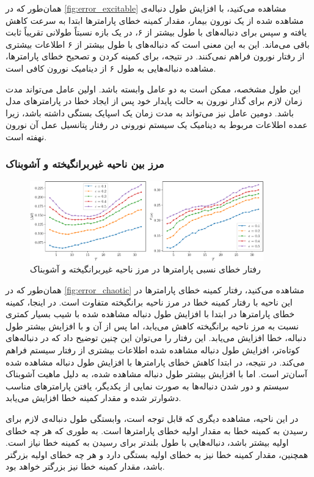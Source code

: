 همان‌طور که در
\autoref{fig:error_excitable}
مشاهده می‌کنید، با افزایش طول دنباله‌ی مشاهده شده از یک نورون بیمار، مقدار کمینه خطای پارامترها ابتدا به سرعت کاهش یافته و سپس
برای دنباله‌های با طول بیشتر از ۶، در یک بازه نسبتاً طولانی تقریباً ثابت باقی می‌ماند.
این به این معنی است که دنباله‌های با طول بیشتر از ۶ اطلاعات بیشتری از رفتار نورون فراهم نمی‌کنند.
در نتیجه، برای کمینه کردن و تصحیح خطای پارامترها، مشاهده دنباله‌هایی به طول ۶ از دینامیک نورون کافی است.

این طول مشخصه، ممکن است به دو عامل وابسته باشد.
اولین عامل می‌تواند مدت زمان لازم برای گذار نورون به حالت پایدار خود پس از ایجاد خطا در پارامتر‌های مدل باشد.
دومین عامل نیز می‌تواند به مدت زمان یک اسپایک بستگی داشته باشد، زیرا عمده اطلاعات مربوط به دینامیک یک سیستم نورونی در رفتار پتانسیل عمل آن نورون نهفته است.

\subsubsection{مرز بین ناحیه غیربرانگیخته و آشوبناک}

\begin{figure}[!ht]
    \centering
    \includegraphics[width=0.9\textwidth]{figures/error_chaotic}
    \caption{رفتار خطای نسبی پارامترها در مرز ناحیه غیربرانگیخته و آشوبناک}
    \label{fig:error_chaotic}
\end{figure}

همان‌طور که در
\autoref{fig:error_chaotic}
مشاهده می‌کنید،
رفتار کمینه خطای پارامترها در این ناحیه با رفتار کمینه خطا در مرز ناحیه برانگیخته متفاوت است.
در اینجا، کمینه خطای پارامترها در ابتدا با افزایش طول دنباله مشاهده شده با شیب بسیار کمتری نسبت به مرز ناحیه برانگیخته کاهش می‌یابد، اما پس از آن و با افزایش بیشتر طول دنباله، خطا افزایش می‌یابد.
این رفتار را می‌توان این چنین توضیح داد که در دنباله‌های کوتاه‌تر، افزایش طول دنباله مشاهده شده اطلاعات بیشتری از رفتار سیستم فراهم می‌کند.
در نتیجه، در ابتدا کاهش خطای پارامترها با افزایش طول دنباله مشاهده شده آسان‌تر است.
اما با افزایش بیشتر طول دنباله مشاهده شده، به دلیل ماهیت آشوبناک سیستم و دور شدن دنباله‌ها به صورت نمایی از یکدیگر، یافتن پارامترهای مناسب دشوارتر شده و مقدار کمینه خطا افزایش می‌یابد.

در این ناحیه، مشاهده دیگری که قابل توجه است، وابستگی طول دنباله‌ی لازم برای رسیدن به کمینه خطا به مقدار اولیه خطای پارامترها است.
به طوری که هر چه خطای اولیه بیشتر باشد، دنباله‌هایی با طول بلندتر برای رسیدن به کمینه خطا نیاز است.
همچنین، مقدار کمینه خطا نیز به خطای اولیه بستگی دارد و هر چه خطای اولیه بزرگتر باشد، مقدار کمینه خطا نیز بزرگتر خواهد بود.

